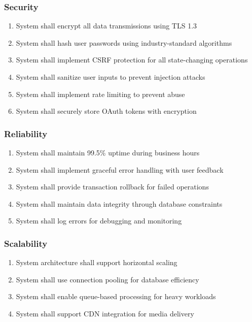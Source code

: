 \subsubsection{Security}

\begin{enumerate}[label=NFR2.\arabic*]
    \item System shall encrypt all data transmissions using TLS 1.3
    \item System shall hash user passwords using industry-standard algorithms
    \item System shall implement CSRF protection for all state-changing operations
    \item System shall sanitize user inputs to prevent injection attacks
    \item System shall implement rate limiting to prevent abuse
    \item System shall securely store OAuth tokens with encryption
\end{enumerate}

\subsubsection{Reliability}

\begin{enumerate}[label=NFR3.\arabic*]
    \item System shall maintain 99.5\% uptime during business hours
    \item System shall implement graceful error handling with user feedback
    \item System shall provide transaction rollback for failed operations
    \item System shall maintain data integrity through database constraints
    \item System shall log errors for debugging and monitoring
\end{enumerate}

\subsubsection{Scalability}

\begin{enumerate}[label=NFR4.\arabic*]
    \item System architecture shall support horizontal scaling
    \item System shall use connection pooling for database efficiency
    \item System shall enable queue-based processing for heavy workloads
    \item System shall support CDN integration for media delivery
\end{enumerate}

